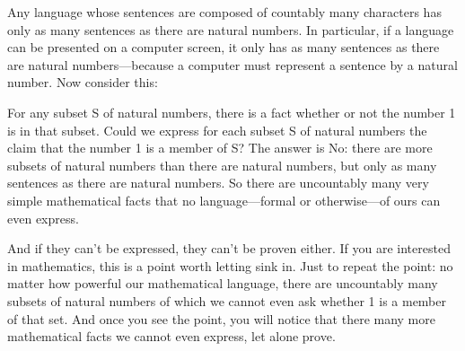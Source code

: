 \begin{enumerate}
{Any language whose sentences are composed of countably many characters has only 
as many sentences as there are natural numbers. In particular, if a language can 
be presented on a computer screen, it only has as many sentences as there are 
natural numbers---because a computer must represent a sentence by a natural 
number. Now consider this:

For any subset S of natural numbers, there is a fact whether or not the number 1 
is in that subset. Could we express for each subset S of natural numbers the 
claim that the number 1 is a member of S? The answer is No: there are more 
subsets of natural numbers than there are natural numbers, but only as many 
sentences as there are natural numbers. So there are uncountably many very 
simple mathematical facts that no language---formal or otherwise---of ours can 
even express. 

And if they can't be expressed, they can't be proven either. If you are 
interested in mathematics, this is a point worth letting sink in. Just to repeat 
the point:  no matter how powerful our mathematical language, there are 
uncountably many subsets of natural numbers of which we cannot even ask whether 
1 is a member of that set. And once you see the point, you will notice that 
there many more mathematical facts we cannot even express, let alone prove.

}

\end{enumerate}


